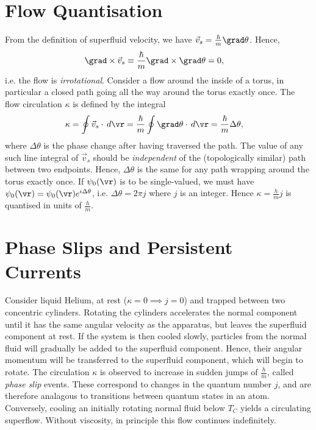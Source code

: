 \documentclass[qo.tex]{subfiles}
\begin{document}
\section{Flow Quantisation}
From the definition of superfluid velocity, we have $\vec{v}_s = \frac{\hbar}{m}\grad\theta$.
Hence, 
\begin{align}
    \grad\times\vec{v}_s &\equiv \frac{\hbar}{m}\grad\times\grad\theta=0,
\end{align}
i.e. the flow is \emph{irrotational}.
Consider a flow around the inside of a torus, in particular a closed path going all the way around the torus exactly once. 
The flow circulation $\kappa$ is defined by the integral
\begin{align}
    \kappa &= \oint \vec{v}_s\cdot\,d\vr = \frac{\hbar}{m}\oint \grad\theta\cdot\,d\vr = \frac{\hbar}{m}\Delta\theta,
\end{align}
where $\Delta\theta$ is the phase change after having traversed the path. 
The value of any such line integral of $\vec{v}_s$ should be \emph{independent} of the (topologically similar) path between two endpoints. 
Hence, $\Delta\theta$ is the same for any path wrapping around the torus exactly once. 
If $\psi_0(\vr)$ is to be single-valued, we must have $\psi_0(\vr)=\psi_0(\vr)e^{i\Delta\theta}$, i.e. $\Delta\theta=2\pi j$ where $j$ is an integer. 
Hence $\kappa=\frac{h}{m}j$ is quantised in units of $\frac{h}{m}$.

\section{Phase Slips and Persistent Currents}
Consider liquid Helium, at rest ($\kappa=0\implies j=0$) and trapped between two concentric cylinders.
Rotating the cylinders accelerates the normal component until it has the same angular velocity as the apparatus, but leaves the superfluid component at rest.
If the system is then cooled slowly, particles from the normal fluid will gradually be added to the superfluid component.
Hence, their angular momentum will be transferred to the superfluid component, which will begin to rotate.
The circulation $\kappa$ is observed to increase in sudden jumps of $\frac{h}{m}$, called \emph{phase slip} events.
These correspond to changes in the quantum number $j$, and are therefore analagous to transitions between quantum states in an atom. 
Conversely, cooling an initially rotating normal fluid below $T_C$ yields a circulating superflow. 
Without viscosity, in principle this flow continues indefinitely. 
\end{document}
